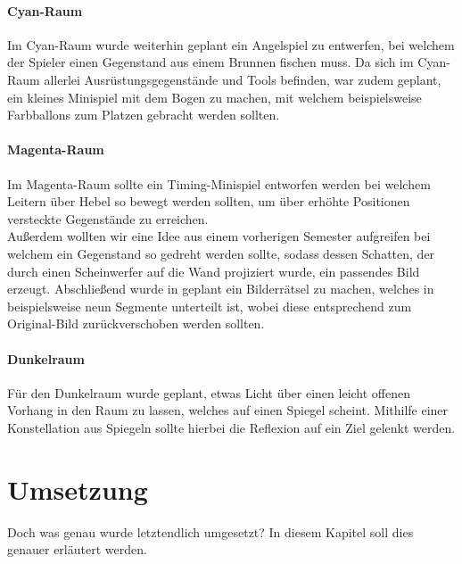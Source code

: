 \subsubsection{Cyan-Raum}
Im Cyan-Raum wurde weiterhin geplant ein Angelspiel zu entwerfen, bei welchem der Spieler einen Gegenstand aus einem Brunnen fischen muss. 
Da sich im Cyan-Raum allerlei Ausrüstungsgegenstände und Tools befinden, war zudem geplant, ein kleines Minispiel mit dem Bogen zu machen, mit welchem beispielsweise Farbballons zum Platzen gebracht werden sollten.
\subsubsection{Magenta-Raum}
Im Magenta-Raum sollte ein Timing-Minispiel entworfen werden bei welchem Leitern über Hebel so bewegt werden sollten, um über erhöhte Positionen versteckte Gegenstände zu erreichen.\\
Außerdem wollten wir eine Idee aus einem vorherigen Semester aufgreifen bei welchem ein Gegenstand so gedreht werden sollte, sodass dessen Schatten, der durch einen Scheinwerfer auf die Wand projiziert wurde, ein passendes Bild erzeugt. Abschließend wurde in geplant ein Bilderrätsel zu machen, welches in beispielsweise neun Segmente unterteilt ist, wobei diese entsprechend zum Original-Bild zurückverschoben werden sollten. 
\subsubsection{Dunkelraum}
Für den Dunkelraum wurde geplant, etwas Licht über einen leicht offenen Vorhang in den Raum zu lassen, welches auf einen Spiegel scheint. Mithilfe einer Konstellation aus Spiegeln sollte hierbei die Reflexion auf ein Ziel gelenkt werden.


\chapter{Umsetzung}
Doch was genau wurde letztendlich umgesetzt? In diesem Kapitel soll dies genauer erläutert werden.
